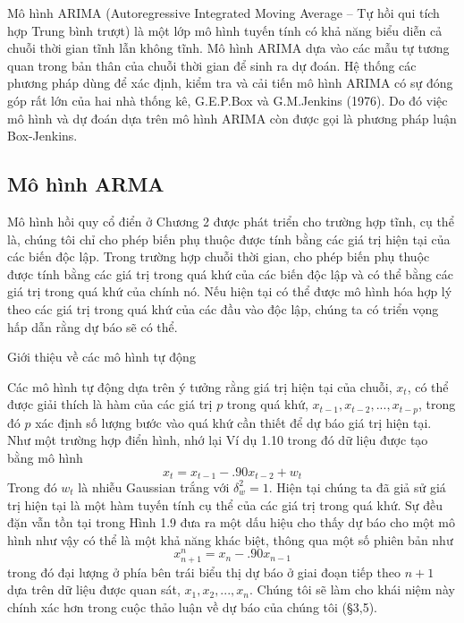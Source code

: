 \documentclass[12pt, a4paper,oneside]{book}
\theoremstyle{definition}
\begin{document}
Mô hình ARIMA (Autoregressive Integrated Moving Average – Tự hồi qui tích hợp Trung bình trượt) là một lớp mô hình tuyến tính có khả năng biểu diễn cả chuỗi thời gian tĩnh lẫn không tĩnh. Mô hình ARIMA dựa vào các mẫu tự tương quan trong bản thân của chuỗi thời gian để sinh ra dự đoán. Hệ thống các phương pháp dùng để xác định, kiểm tra và cải tiến mô hình ARIMA có sự đóng góp rất lớn của hai nhà thống kê, G.E.P.Box và G.M.Jenkins (1976). Do đó việc mô hình và dự đoán dựa trên mô hình ARIMA còn được gọi là phương pháp luận Box-Jenkins. 
\subsection{Mô hình ARMA}
Mô hình hồi quy cổ điển ở Chương 2 được phát triển cho trường hợp tĩnh, cụ thể là, chúng tôi chỉ cho phép biến phụ thuộc được tính bằng các giá trị hiện tại của các biến độc lập. Trong trường hợp chuỗi thời gian, cho phép biến phụ thuộc được tính bằng các giá trị trong quá khứ của các biến độc lập và có thể bằng các giá trị trong quá khứ của chính nó. Nếu hiện tại có thể được mô hình hóa hợp lý theo các giá trị trong quá khứ của các đầu vào độc lập, chúng ta có triển vọng hấp dẫn rằng dự báo sẽ có thể.

Giới thiệu về các mô hình tự động

Các mô hình tự động dựa trên ý tưởng rằng giá trị hiện tại của chuỗi, $x_{t}$, có thể được giải thích là hàm của các giá trị $p$ trong quá khứ, $x_{t-1}, x_{t-2}, ..., x_{t-p}$, trong đó $p$ xác định số lượng bước vào quá khứ cần thiết để dự báo giá trị hiện tại. Như một trường hợp điển hình, nhớ lại Ví dụ 1.10 trong đó dữ liệu được tạo bằng mô hình
$$x_{t}= x_{t-1} - .90x_{t-2} +w_{t}$$
Trong đó $w_{t} $ là nhiễu Gaussian trắng với $\delta_{w}^{2}=1$. Hiện tại chúng ta đã giả sử giá trị hiện tại là một hàm tuyến tính cụ thể của các giá trị trong quá khứ. Sự đều đặn vẫn tồn tại trong Hình 1.9 đưa ra một dấu hiệu cho thấy dự báo cho một mô hình như vậy có thể là một khả năng khác biệt, thông qua một số phiên bản như
$$x_{n+1}^{n} =  x_{n} - .90x_{n-1}$$
trong đó đại lượng ở phía bên trái biểu thị dự báo ở giai đoạn tiếp theo $n + 1$ dựa trên dữ liệu được quan sát, $x_{1}, x_{2}, ..., x_{n}$. Chúng tôi sẽ làm cho khái niệm này chính xác hơn trong cuộc thảo luận về dự báo của chúng tôi (§3,5).
\end{document}
